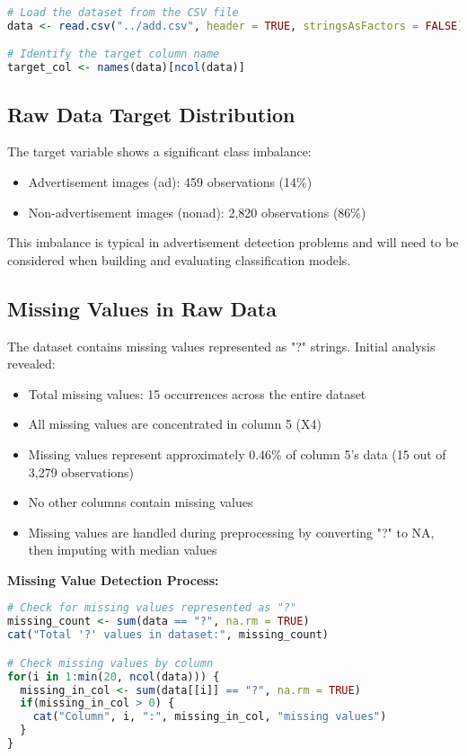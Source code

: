 \begin{lstlisting}[language=R]
# Load the dataset from the CSV file
data <- read.csv("../add.csv", header = TRUE, stringsAsFactors = FALSE)

# Identify the target column name
target_col <- names(data)[ncol(data)]
\end{lstlisting}

\subsection{Raw Data Target Distribution}
The target variable shows a significant class imbalance:
\begin{itemize}
    \item Advertisement images (ad): 459 observations (14\%)
    \item Non-advertisement images (nonad): 2,820 observations (86\%)
\end{itemize}

This imbalance is typical in advertisement detection problems and will need to be considered when building and evaluating classification models.

\subsection{Missing Values in Raw Data}
The dataset contains missing values represented as "?" strings. Initial analysis revealed:
\begin{itemize}
    \item Total missing values: 15 occurrences across the entire dataset
    \item All missing values are concentrated in column 5 (X4)
    \item Missing values represent approximately 0.46\% of column 5's data (15 out of 3,279 observations)
    \item No other columns contain missing values
    \item Missing values are handled during preprocessing by converting "?" to NA, then imputing with median values
\end{itemize}

\textbf{Missing Value Detection Process:}
\begin{lstlisting}[language=R]
# Check for missing values represented as "?"
missing_count <- sum(data == "?", na.rm = TRUE)
cat("Total '?' values in dataset:", missing_count)

# Check missing values by column
for(i in 1:min(20, ncol(data))) {
  missing_in_col <- sum(data[[i]] == "?", na.rm = TRUE)
  if(missing_in_col > 0) {
    cat("Column", i, ":", missing_in_col, "missing values")
  }
}
\end{lstlisting}

